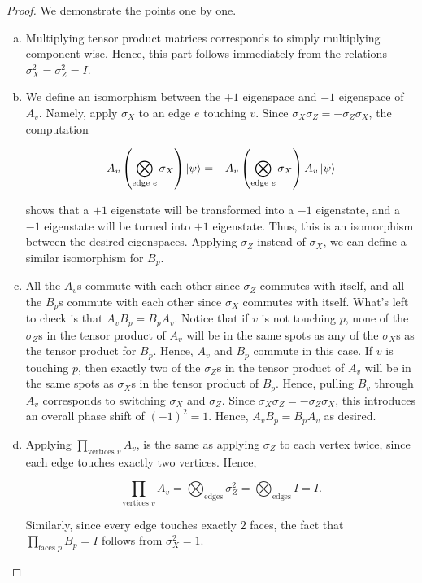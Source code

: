 \documentclass{article}
\theoremstyle{definition}
\numberwithin{figure}{section}
\begin{document}
\begin{proof} We demonstrate the points one by one.

\begin{enumerate}[(a)]
\item Multiplying tensor product matrices corresponds to simply multiplying component-wise. Hence, this part  follows immediately from the relations $\sigma_X^2=\sigma_Z^2=I$.

\item We define an isomorphism between the $+1$ eigenspace and $-1$ eigenspace of $A_v$. Namely, apply $\sigma_X$ to an edge $e$ touching $v$. Since $\sigma_X\sigma_Z=-\sigma_Z\sigma_X$, the computation

$$A_v \left(\bigotimes_{\text{edge }e}\sigma_X\right)\left|\psi\right> = -A_v \left(\bigotimes_{\text{edge }e}\sigma_X\right)A_v\left|\psi\right> $$

shows that a $+1$ eigenstate will be transformed into a $-1$ eigenstate, and a $-1$ eigenstate will be turned into $+1$ eigenstate. Thus, this is an isomorphism between the desired eigenspaces. Applying $\sigma_Z$ instead of $\sigma_X$, we can define a similar isomorphism for $B_p$.

\item All the $A_v$s commute with each other since $\sigma_Z$ commutes with itself, and all the $B_p$s commute with each other since $\sigma_X$ commutes with itself. What's left to check is that $A_vB_p=B_pA_v$. Notice that if $v$ is not touching $p$, none of the $\sigma_Z$s in the tensor product of $A_v$ will be in the same spots as any of the $\sigma_X$s as the tensor product for $B_p$. Hence, $A_v$ and $B_p$ commute in this case. If $v$ is touching $p$, then exactly two of the $\sigma_Z$s in the tensor product of $A_v$ will be in the same spots as $\sigma_X$s in the tensor product of $B_p$. Hence, pulling $B_v$ through $A_v$ corresponds to switching $\sigma_X$ and $\sigma_Z$. Since $\sigma_X\sigma_Z=-\sigma_Z\sigma_X$, this introduces an overall phase shift of $(-1)^2=1$. Hence, $A_vB_p=B_pA_v$ as desired.

\item  Applying $\prod_{\text{vertices } v}A_v$, is the same as applying $\sigma_Z$ to each vertex twice, since each edge touches exactly two vertices. Hence,

$$\prod_{\text{vertices } v}A_v=\bigotimes_{\text{edges}}\sigma^2_Z=\bigotimes_{\text{edges}}I=I.$$

Similarly, since every edge touches exactly $2$ faces, the fact that $\prod_{\text{faces } p}B_p=I$ follows from $\sigma^2_X=1$.

\end{enumerate}
\end{proof}
\end{document}
